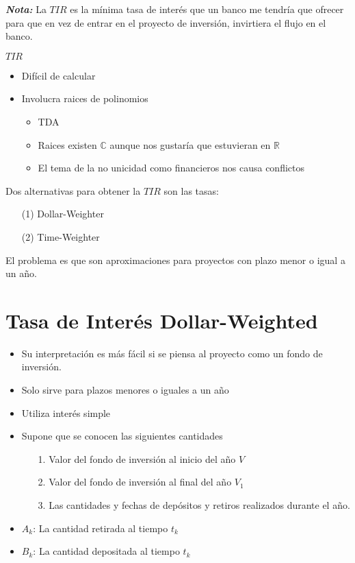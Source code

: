 \textit{\textbf{Nota:}} La $TIR$ es la mínima tasa de interés que un banco me tendría que ofrecer para que en vez de entrar en el proyecto de inversión, invirtiera el flujo en el banco.

\begin{definition} $TIR$
\begin{itemize}
\item Difícil de calcular
\item Involucra raices de polinomios\begin{itemize}
    \item TDA
    \item Raices existen $\mathbb{C}$ aunque nos gustaría que estuvieran en $\mathbb{R}$
    \item El tema de la no unicidad como financieros nos causa conflictos
\end{itemize}
\end{itemize}
\end{definition}

Dos alternativas para obtener la $TIR$ son las tasas: \begin{itemize}
    \item[(1)] Dollar-Weighter
    \item[(2)] Time-Weighter
\end{itemize}
El problema es que son aproximaciones para proyectos con plazo menor o igual a un año.

\section*{Tasa de Interés Dollar-Weighted}
\begin{itemize}
    \item Su interpretación es más fácil si se piensa al proyecto como un fondo de inversión.
    \item Solo sirve para plazos menores o iguales a un año
    \item Utiliza interés simple
    \item Supone que se conocen las siguientes cantidades\begin{itemize}
        \item[1.] Valor del fondo de inversión al inicio del año $V$
        \item[2.] Valor del fondo de inversión al final del año $V_1$
        \item[3.] Las cantidades y fechas de depósitos y retiros realizados durante el año.
    \end{itemize}
    \item $A_k$: La cantidad retirada al tiempo $t_k$
    \item $B_k$: La cantidad depositada al tiempo $t_k$
\end{itemize}

